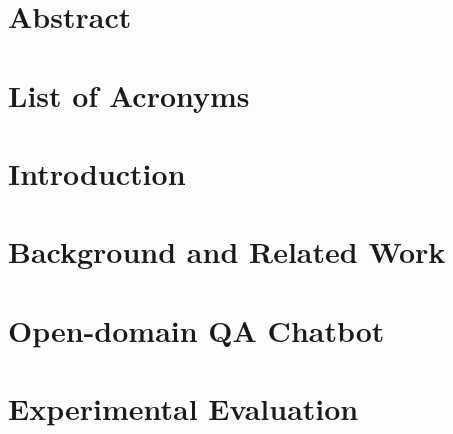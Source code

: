 \documentclass[
     12pt,         %
     a4paper,      %
     BCOR10mm,     %
     DIV14,        %
     ]{scrreprt}
\begin{document}
\chapter*{Abstract}

\newpage

\tableofcontents
\cleardoublepage
{} 

\chapter*{List of Acronyms}
\printglossary[type=\acronymtype]

\listoffigures
\listoftables



\chapter{Introduction}
\label{chap:intro}


\newpage

\chapter{Background and Related Work}
\label{chap:grundlagen}



\newpage

\chapter{Open-domain QA Chatbot}
\label{chap:main}




\newpage

\chapter{Experimental Evaluation}
\label{chap:eval}
\end{document}
